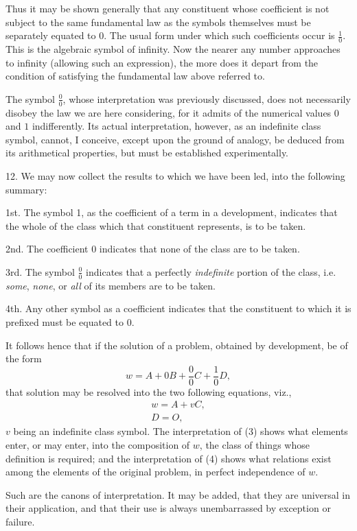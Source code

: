 \documentclass[oneside]{book}
\begin{document}
Thus it may be shown generally that any constituent whose
coefficient is not subject to the same fundamental law as the symbols
themselves must be separately equated to $0$. The usual
form under which such coefficients occur is $\frac{1}{0}$. This is the algebraic
symbol of infinity. Now the nearer any number approaches
to infinity (allowing such an expression), the more does it depart
from the condition of satisfying the fundamental law above referred
to.

The symbol $\frac{0}{0}$, whose interpretation was previously discussed,
does not necessarily disobey the law we are here considering,
for it admits of the numerical values $0$ and $1$ indifferently.
Its actual interpretation, however, as an indefinite class symbol,
cannot, I conceive, except upon the ground of analogy, be deduced
from its arithmetical properties, but must be established
experimentally.

12. We may now collect the results to which we have been
led, into the following summary:

1st. The symbol 1, as the coefficient of a term in a development,
indicates that the whole of the class which that constituent
represents, is to be taken.

2nd. The coefficient 0 indicates that none of the class are to
be taken.

3rd. The symbol $\frac{0}{0}$ indicates that a perfectly \textit{indefinite} portion
of the class, i.e. \textit{some}, \textit{none}, or \textit{all} of its members are to be
taken.

4th. Any other symbol as a coefficient indicates that the
constituent to which it is prefixed must be equated to 0.

It follows hence that if the solution of a problem, obtained
by development, be of the form
\[
w = A+0B+\frac{0}{0}C+\frac{1}{0}D,
\]
that solution may be resolved into the two following equations,
viz.,
\begin{eqnarray}
w = A + vC,\\
D = O,
\end{eqnarray}
$v$ being an indefinite class symbol. The interpretation of (3)
shows what elements enter, or may enter, into the composition
of $w$, the class of things whose definition is required; and the
interpretation of (4) shows what relations exist among the elements
of the original problem, in perfect independence of $w$.

Such are the canons of interpretation. It may be added, that
they are universal in their application, and that their use is
always unembarrassed by exception or failure.
\end{document}

